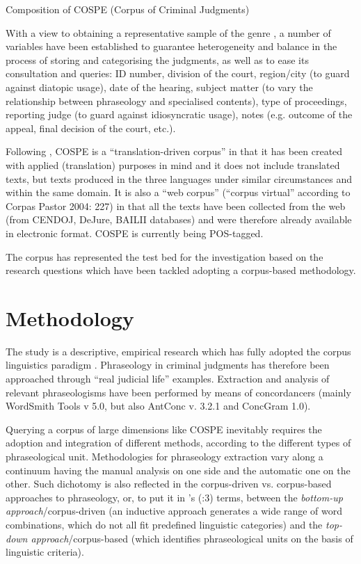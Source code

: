 \documentclass[output=paper]{LSP/langsci}
\begin{document}
\begin{table}
\caption{Composition of COSPE (Corpus of Criminal Judgments)}
     \label{6.3}
\end{table} 

With a view to obtaining a representative sample of the genre \citep[see][243]{Biber1993}, a number of variables have been established to guarantee heterogeneity and balance in the process of storing and categorising the judgments, as well as to ease its consultation and queries: ID number, division of the court, region/city (to guard against diatopic usage), date of the hearing, subject matter (to vary the relationship between phraseology and specialised contents), type of proceedings, reporting judge (to guard against idiosyncratic usage), notes (e.g. outcome of the appeal, final decision of the court, etc.).

Following \citet[105-107]{Zanettin2012}, COSPE is a “translation-driven corpus” in that it has been created with applied (translation) purposes in mind and it does not include translated texts, but texts produced in the three languages under similar circumstances and within the same domain. It is also a “web corpus” (“corpus virtual” according to Corpas Pastor 2004: 227) in that all the texts have been collected from the web (from CENDOJ, DeJure, BAILII databases) and were therefore already available in electronic format. COSPE is currently being POS-tagged.

The corpus has represented the test bed for the investigation based on the research questions which have been tackled adopting a corpus-based methodology.

\section{Methodology}
The study is a descriptive, empirical research which has fully adopted the corpus linguistics paradigm \citep[see][]{McEnery2006}. Phraseology in criminal judgments has therefore been approached through “real judicial life” examples. Extraction and analysis of relevant phraseologisms have been performed by means of concordancers (mainly WordSmith Tools v 5.0, but also AntConc v. 3.2.1 and ConcGram 1.0).

Querying a corpus of large dimensions like COSPE inevitably requires the adoption and integration of different methods, according to the different types of phraseological unit. Methodologies for phraseology extraction vary along a continuum having the manual analysis on one side and the automatic one on the other. Such dichotomy is also reflected in the corpus-driven vs. corpus-based approaches to phraseology, or, to put it in \citeauthor{Granger2005}'s (\citeyear{Granger2005}:3) terms, between the \textit{bottom-up approach}/corpus-driven (an inductive approach generates a wide range of word combinations, which do not all fit predefined linguistic categories) and the \textit{top-down approach}/corpus-based (which identifies phraseological units on the basis of linguistic criteria).
\end{document}

